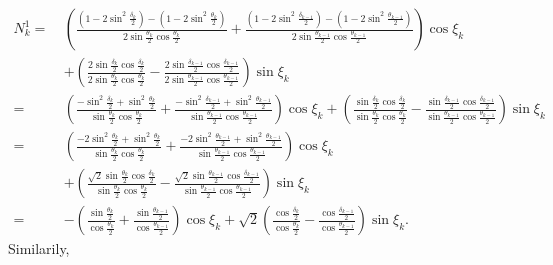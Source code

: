\documentclass[12pt]{article}
\begin{document}
\begin{equation*}
  \begin{split}
N_{k}^1 
= \ & \left(
  \frac{\left(1- 2 \sin^2 \frac{\delta_{k}}{2}\right)-\left(1 -2\sin^2 \frac{\theta_k}{2} \right)}{2 \sin \frac{\theta_k}{2} \cos\frac{\theta_k}{2}}
  + 
  \frac{\left(1- 2 \sin^2 \frac{\delta_{k-1}}{2}\right)-\left(1 -2\sin^2 \frac{\theta_{k-1}}{2} \right)}{2 \sin \frac{\theta_{k-1}}{2} \cos\frac{\theta_{k-1}}{2}}
  \right) \cos \xi_{k}\\
  & + 
  \left(
    \frac{2\sin \frac{\delta_{k}}{2} \cos\frac{\delta_{k}}{2}}{2\sin \frac{\theta_k}{2} \cos\frac{\theta_k}{2}}
  - 
  \frac{2\sin \frac{\delta_{k-1}}{2} \cos\frac{\delta_{k-1}}{2}}{2\sin \frac{\theta_{k-1}}{2} \cos\frac{\theta_{k-1}}{2}}
  \right) 
  \sin \xi_k \\
= \ & \left(
  \frac{-  \sin^2 \frac{\delta_{k}}{2}
  + \sin^2 \frac{\theta_k}{2}}{ \sin \frac{\theta_k}{2} \cos\frac{\theta_k}{2}}
  + 
  \frac{-  \sin^2 \frac{\delta_{k-1}}{2}
  + \sin^2 \frac{\theta_{k-1}}{2} }{ \sin \frac{\theta_{k-1}}{2} \cos\frac{\theta_{k-1}}{2}}
  \right) \cos \xi_{k} 
  + 
  \left(
    \frac{\sin \frac{\delta_{k}}{2} \cos\frac{\delta_{k}}{2}}{\sin \frac{\theta_k}{2} \cos\frac{\theta_k}{2}}
  - 
  \frac{\sin \frac{\delta_{k-1}}{2} \cos\frac{\delta_{k-1}}{2}}{\sin \frac{\theta_{k-1}}{2} \cos\frac{\theta_{k-1}}{2}}
  \right) 
  \sin \xi_k \\
= \ & \left(
  \frac{-  2\sin^2 \frac{\theta_{k}}{2}
  + \sin^2 \frac{\theta_k}{2}}{ \sin \frac{\theta_k}{2} \cos\frac{\theta_k}{2}}
  + 
  \frac{-  2\sin^2 \frac{\theta_{k-1}}{2}
  + \sin^2 \frac{\theta_{k-1}}{2} }{ \sin \frac{\theta_{k-1}}{2} \cos\frac{\theta_{k-1}}{2}}
  \right) \cos \xi_{k} \\
  & + 
  \left(
    \frac{\sqrt{2} \sin \frac{\theta_{k}}{2} \cos\frac{\delta_{k}}{2}}{\sin \frac{\theta_k}{2} \cos\frac{\theta_k}{2}}
  - 
  \frac{\sqrt{2}\sin \frac{\theta_{k-1}}{2} \cos\frac{\delta_{k-1}}{2}}{\sin \frac{\theta_{k-1}}{2} \cos\frac{\theta_{k-1}}{2}}
  \right) 
  \sin \xi_k \\
=\ & -\left(
  \frac{\sin  \frac{\theta_k}{2} }{\cos \frac{\theta_k}{2}}
  + \frac{\sin  \frac{\theta_{k-1}}{2}}{\cos \frac{\theta_{k-1}}{2}}
  \right) \cos \xi_{k}
  + \sqrt{2} \left(
    \frac{\cos \frac{\delta_{k}}{2}}{\cos \frac{\theta_k}{2}}
  - \frac{\cos \frac{\delta_{k-1}}{2}}{\cos \frac{\theta_{k-1}}{2}}
  \right) \sin \xi_k .
\end{split}
\end{equation*}
Similarily,
\end{document}
